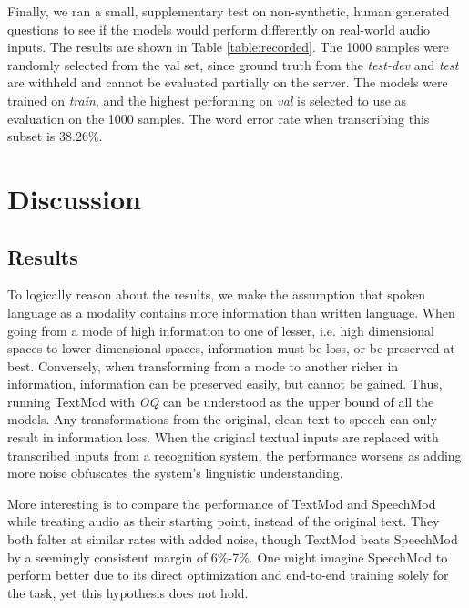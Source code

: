 \documentclass[letterpaper]{article} %
\begin{document}
Finally, we ran a small, supplementary test on non-synthetic, human generated questions to see if the models would perform differently on real-world audio inputs. The results are shown in Table \ref{table:recorded}. The 1000 samples were randomly selected from the val set, since ground truth from the \textit{test-dev} and \textit{test} are withheld and cannot be evaluated partially on the server. The models were trained on \textit{train}, and the highest performing on \textit{val} is selected to use as evaluation on the 1000 samples. The word error rate when transcribing this subset is 38.26\%.


\section{Discussion}
\label{sec:discussion}
\subsection{Results}

To logically reason about the results, we make the assumption that spoken language as a modality contains more information than written language. When going from a mode of high information to one of lesser, i.e. high dimensional spaces to lower dimensional spaces, information must be loss, or be preserved at best. Conversely, when transforming from a mode to another richer in information, information can be preserved easily, but cannot be gained. Thus, running TextMod with \textit{OQ} can be understood as the upper bound of all the models. Any transformations from the original, clean text to speech can only result in information loss. When the original textual inputs are replaced with transcribed inputs from a recognition system, the performance worsens as adding more noise obfuscates the system's linguistic understanding.

More interesting is to compare the performance of TextMod and SpeechMod while treating audio as their starting point, instead of the original text. They both falter at similar rates with added noise, though TextMod beats SpeechMod by a seemingly consistent margin of 6\%-7\%. One might imagine SpeechMod to perform better due to its direct optimization and end-to-end training solely for the task, yet this hypothesis does not hold.
\end{document}
